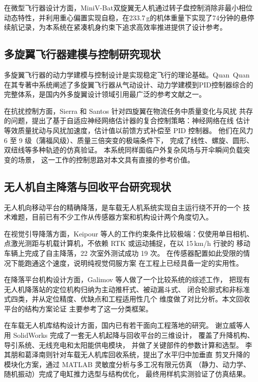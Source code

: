在微型飞行器设计方面，MiniV-Bat双旋翼无人机通过转子盘控制消除非最小相位动态特性，并利用重心偏置实现自稳，在233.7\,g的机体重量下实现了74分钟的悬停续航记录\cite{minivbat2023}，为本系统在紧凑机身约束下追求高效率推进提供了设计参考。

\subsection{多旋翼飞行器建模与控制研究现状}

多旋翼飞行器的动力学建模与控制设计是实现稳定飞行的理论基础。Quan~Quan在其专著中系统阐述了多旋翼飞行器从气动设计、动力学建模到PID控制器综合的完整体系，是国内外多旋翼设计领域引用最广泛的参考文献之一\cite{quanquan2017}。

在抗扰控制方面，Sierra 和 Santos 针对四旋翼在物流任务中质量变化与风扰
共存的问题，提出了基于自适应神经网络估计器的复合控制策略：神经网络在线
估计等效质量扰动与风扰加速度，估计值以前馈方式补偿至 PID 控制器。
他们在风力 6 至 9 级（蒲福风级）、质量三倍突变的极端条件下，
完成了线性、螺旋、圆形、双纽线等多种轨迹的仿真验证\cite{sierra2019}。
本系统同样面临户外复杂风场与开伞瞬间负载突变的场景，
这一工作的控制思路对本文具有直接的参考价值。

\subsection{无人机自主降落与回收平台研究现状}

无人机向移动平台的精确降落，是车载无人机系统实现自主运行绕不开的一个
技术难题，目前已有不少工作从传感器方案和机构设计两个角度切入。

在视觉引导降落方面，Keipour 等人的工作约束条件比较极端：仅使用单目相机、
点激光测距与机载计算机，不依赖 RTK 或运动捕捉，在以 15\,km/h 行驶的
移动车辆上完成了自主降落，22 次室外测试成功 19 次\cite{keipour2022}。
在传感器配置如此受限的情况下能跑通这个速度，说明纯视觉伺服方案
在工程上已经具备一定的实用性。

在降落平台机构设计方面，Galimov 等人做了一个比较系统的综述工作，
把现有无人机降落站的定位机构归纳为主动推杆式、被动漏斗式、
闭合轮廓式和非标准式四类，并从定位精度、优缺点和工程适用性几个
维度做了对比分析\cite{galimov2020}。本文回收平台的结构方案论证
主要参考了这一分类框架。

在车载无人机库结构设计方面，国内已有若干面向工程落地的研究。
谢立威等人用 SolidWorks 完成了一套无人机起降与回收平台的三维设计，
覆盖了升降机构、导引系统、无线充电和太阳能供电模块，
并做了关键部件的参数计算和选型\cite{xieliwei2023}。
李其朋和葛泽南则针对车载无人机库回收系统，提出了水平归中加垂直
剪叉升降的模块化方案，通过 MATLAB 灵敏度分析与多工况有限元仿真
（静力、动力学、随机振动）完成了电缸推力选型与结构优化，
最终用样机实测验证了仿真结果\cite{liqipeng2026}。

